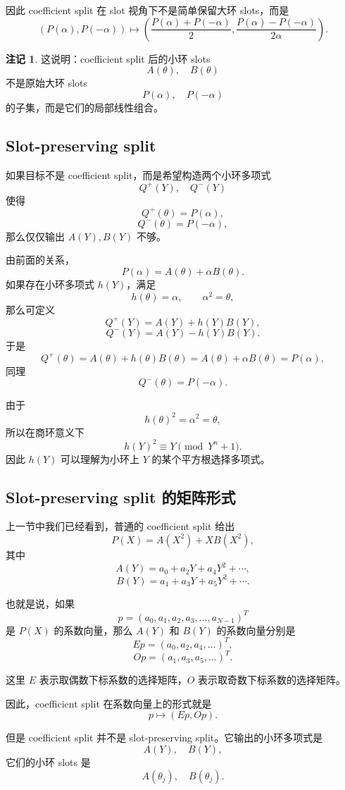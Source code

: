 \documentclass[UTF8,11pt]{ctexart}
\theoremstyle{definition}
\newtheorem{remark}{注记}
\begin{document}
因此 coefficient split 在 slot 视角下不是简单保留大环 slots，而是
\[
(P(\alpha),P(-\alpha))
\longmapsto
\left(
\frac{P(\alpha)+P(-\alpha)}{2},
\frac{P(\alpha)-P(-\alpha)}{2\alpha}
\right).
\]

\begin{remark}
这说明：coefficient split 后的小环 slots
\[
A(\theta),\quad B(\theta)
\]
不是原始大环 slots
\[
P(\alpha),\quad P(-\alpha)
\]
的子集，而是它们的局部线性组合。
\end{remark}

\subsection{Slot-preserving split}

如果目标不是 coefficient split，而是希望构造两个小环多项式
\[
Q^+(Y),\quad Q^-(Y)
\]
使得
\[
Q^+(\theta)=P(\alpha),
\]
\[
Q^-(\theta)=P(-\alpha),
\]
那么仅仅输出 \(A(Y),B(Y)\) 不够。

由前面的关系，
\[
P(\alpha)=A(\theta)+\alpha B(\theta).
\]
如果存在小环多项式 \(h(Y)\)，满足
\[
h(\theta)=\alpha,\qquad \alpha^2=\theta,
\]
那么可定义
\[
Q^+(Y)=A(Y)+h(Y)B(Y),
\]
\[
Q^-(Y)=A(Y)-h(Y)B(Y).
\]
于是
\[
Q^+(\theta)
=
A(\theta)+h(\theta)B(\theta)
=
A(\theta)+\alpha B(\theta)
=
P(\alpha),
\]
同理
\[
Q^-(\theta)=P(-\alpha).
\]

由于
\[
h(\theta)^2=\alpha^2=\theta,
\]
所以在商环意义下
\[
h(Y)^2\equiv Y\pmod{Y^n+1}.
\]
因此 \(h(Y)\) 可以理解为小环上 \(Y\) 的某个平方根选择多项式。
\subsection{Slot-preserving split 的矩阵形式}

上一节中我们已经看到，普通的 coefficient split 给出
\[
P(X)=A(X^2)+XB(X^2),
\]
其中
\[
A(Y)=a_0+a_2Y+a_4Y^2+\cdots,
\]
\[
B(Y)=a_1+a_3Y+a_5Y^2+\cdots.
\]

也就是说，如果
\[
p=(a_0,a_1,a_2,a_3,\ldots,a_{N-1})^T
\]
是 \(P(X)\) 的系数向量，那么 \(A(Y)\) 和 \(B(Y)\) 的系数向量分别是
\[
Ep=(a_0,a_2,a_4,\ldots)^T,
\]
\[
Op=(a_1,a_3,a_5,\ldots)^T.
\]

这里 \(E\) 表示取偶数下标系数的选择矩阵，\(O\) 表示取奇数下标系数的选择矩阵。

因此，coefficient split 在系数向量上的形式就是
\[
p\longmapsto (Ep,Op).
\]

但是 coefficient split 并不是 slot-preserving split。它输出的小环多项式是
\[
A(Y),\quad B(Y),
\]
它们的小环 slots 是
\[
A(\theta_j),\quad B(\theta_j).
\]
\end{document}

